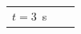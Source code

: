 {\begin{tabular}[t]{|l|l|l|}
    
        \begin{math}t=3\end{math}~s &
    
    
         &
    
    
     \tabularnewline\cline{1-1}\cline{2-2}\cline{3-3}
    \end{tabular}} %
      \addtocounter{footnote}{-0}
      
    

